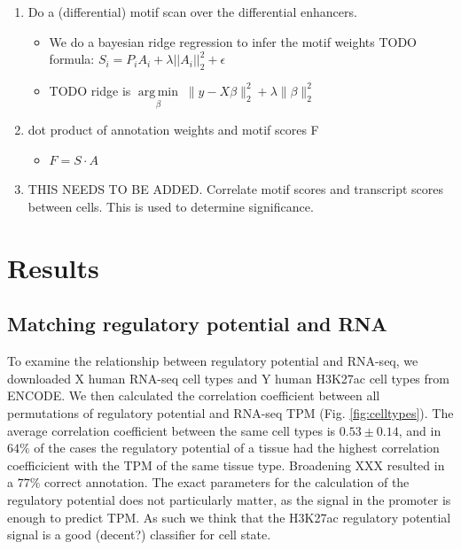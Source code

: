 \begin{enumerate}
    \item Do a (differential) motif scan over the differential enhancers. 
    \begin{itemize}
        \item We do a bayesian ridge regression to infer the motif weights TODO formula: $S_i = P_i A_i + \lambda ||A_i||_2^2 +\epsilon$
        \item TODO ridge is $ \underset{\beta}{\operatorname{arg\,min}}\; \|y - X\beta\|^2_2 + \lambda \|\beta\|^2_2 $
    \end{itemize}
    
    \item dot product of annotation weights and motif scores F
    \begin{itemize}
        \item $F = S \cdot A$
    \end{itemize}

    \item THIS NEEDS TO BE ADDED. Correlate motif scores and transcript scores between cells. This is used to determine significance.
    

\end{enumerate}

\section{Results}

\subsection{Matching regulatory potential and RNA}

To examine the relationship between regulatory potential and RNA-seq, we downloaded X human RNA-seq cell types and Y human H3K27ac cell types from ENCODE. We then calculated the correlation coefficient between all permutations of regulatory potential and RNA-seq TPM (Fig. \ref{fig:celltypes}). The average correlation coefficient between the same cell types is $0.53 \pm 0.14$, and in $64\%$ of the cases the regulatory potential of a tissue had the highest correlation coefficicient with the TPM of the same tissue type. Broadening XXX resulted in a $77\%$ correct annotation. The exact parameters for the calculation of the regulatory potential does not particularly matter, as the signal in the promoter is enough to predict TPM. As such we think that the H3K27ac regulatory potential signal is a good (decent?) classifier for cell state.

